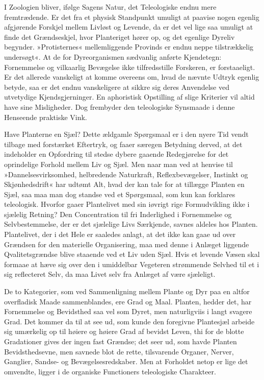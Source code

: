 \documentclass[12pt]{book}
\newcommand{\apage}[1]{\marginnote{\footnotesize\textit{[#1]}}}
\begin{document}
I Zoologien bliver, ifølge Sagens Natur, det Teleologiske endnu mere
fremtrædende. Er det fra et physisk Standpunkt umuligt at paavise nogen
egenlig afgjørende Forskjel mellem Livløst og Levende, da er det vel lige
saa umuligt at finde det Grændseskjel, hvor Planteriget hører op, og det
egenlige Dyreliv begynder. »Protisternes« mellemliggende Provinds er endnu
neppe tilstrækkelig undersøgt«. At de for Dyreorganismen sædvanlig anførte
Kjendetegn: Fornemmelse og vilkaarlig Bevægelse ikke tilfredsstille
Forskeren, er forstaaeligt. Er det allerede vanskeligt at komme overeens
om, hvad de nævnte Udtryk egenlig betyde, saa er det endnu vanskeligere at
sikkre sig deres Anvendelse ved utvetydige Kjendsgjerninger. En aphoristisk
Opstilling af slige Kriterier vil altid have sine Misligheder. Dog frembyder
den teleologiske Synsmaade i denne Henseende praktiske Vink.

\apage{190} Have Planterne en Sjæl? Dette ældgamle Spørgsmaal er i den nyere Tid vendt
tilbage med forstærket Eftertryk, og faaer særegen Betydning derved, at det
indeholder en Opfordring til stedse dybere gaaende Redegjørelse for det
oprindelige Forhold mellem Liv og Sjæl. Men naar man ved at henvise til
»Dannelsesvirksomhed, helbredende Naturkraft, Reflexbevægelser, Instinkt og
Skjønhedsdrift« har udtømt Alt, hvad der kan tale for at tillægge Planten
en Sjæl, saa maa man dog standse ved et Spørgsmaal, som kun kan forklares
teleologisk. Hvorfor gaaer Plantelivet med sin iøvrigt rige Formudvikling
ikke i sjælelig Retning? Den Concentration til fri Inderlighed i
Fornemmelse og Selvbestemmelse, der er det sjælelige Livs Særkjende, savnes
aldeles hos Planten. Plantelivet, der i det Hele er saaledes anlagt, at det
ikke kan gaae ud over Grændsen for den materielle Organisering, maa med
denne i Anlæget liggende Qvalitetsgrændse blive staaende ved et Liv uden
Sjæl. Hvis et levende Væsen skal formaae at hæve sig over den i umiddelbar
Vegeteren strømmende Selvhed til et i sig reflecteret Selv, da maa Livet
selv fra Anlæget af være sjæleligt.

De to Kategorier, som ved Sammenligning mellem Plante og Dyr paa en altfor
overfladisk Maade sammenblandes, ere Grad og Maal. Planten, hedder det, har
Fornemmelse og Bevidsthed saa vel som Dyret, men naturligviis i langt
svagere Grad. Det kommer da til at see ud, som kunde den foregivne
Plantesjæl arbeide sig umærkelig op til høiere og høiere Grad af bevidst
Leven, thi for de blotte Gradationer gives der \apage{191} ingen fast Grændse; det seer
ud, som havde Planten Bevidsthedsevne, men savnede blot de rette,
tilsvarende Organer, Nerver, Ganglier, Sandse- og Bevægelsesredskaber. Men
at Forholdet netop er lige det omvendte, ligger i de organiske Functioners
teleologiske Charakteer.
\end{document}
